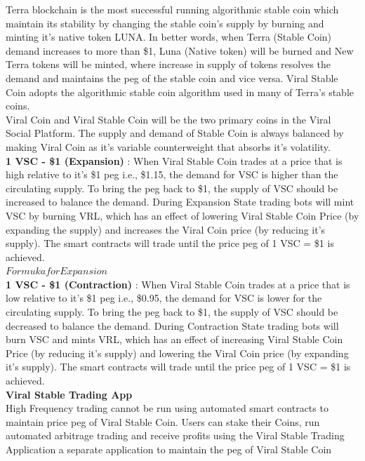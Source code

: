 \documentclass[conference]{IEEEtran}
\begin{document}
Terra blockchain is the most successful running algorithmic stable coin which maintain its stability by changing the stable coin's supply by burning and minting it's native token LUNA. In better words, when Terra (Stable Coin) demand increases to more than \$1, Luna (Native token) will be burned and New Terra tokens will be minted, where increase in supply of tokens resolves the demand and maintains the peg of the stable coin and vice versa. Viral Stable Coin adopts the algorithmic stable coin algorithm used in many of Terra's stable coins.\\

Viral Coin and Viral Stable Coin will be the two primary coins in the Viral Social Platform. The supply and demand of Stable Coin is always balanced by making Viral Coin as it's variable counterweight that absorbs it's volatility.\\

\textbf{1 VSC - \$1 (Expansion)} : When Viral Stable Coin trades at a price that is high relative to it's \$1 peg i.e., \$1.15, the demand for VSC is higher than the circulating supply. To bring the peg back to \$1, the supply of VSC should be increased to balance the demand. During Expansion State trading bots will mint VSC by burning VRL, which has an effect of lowering Viral Stable Coin Price (by expanding the supply) and increases the Viral Coin price (by reducing it's supply). The smart contracts will trade until the price peg of 1 VSC = \$1 is achieved.\\

$Formuka for Expansion$\\

\textbf{1 VSC - \$1 (Contraction)} : When Viral Stable Coin trades at a price that is low relative to it's \$1 peg i.e., \$0.95, the demand for VSC is lower for the circulating supply. To bring the peg back to \$1, the supply of VSC should be decreased to balance the demand. During Contraction State trading bots will burn VSC and mints VRL, which has an effect of increasing Viral Stable Coin Price (by reducing it's supply) and lowering the Viral Coin price (by expanding it's supply). The smart contracts will trade until the price peg of 1 VSC = \$1 is achieved.\\

\textbf{Viral Stable Trading App}\\

High Frequency trading cannot be run using automated smart contracts to maintain price peg of Viral Stable Coin. Users can stake their Coins, run automated arbitrage trading and receive profits using the Viral Stable Trading Application a separate application to maintain the peg of Viral Stable Coin\\
\end{document}
